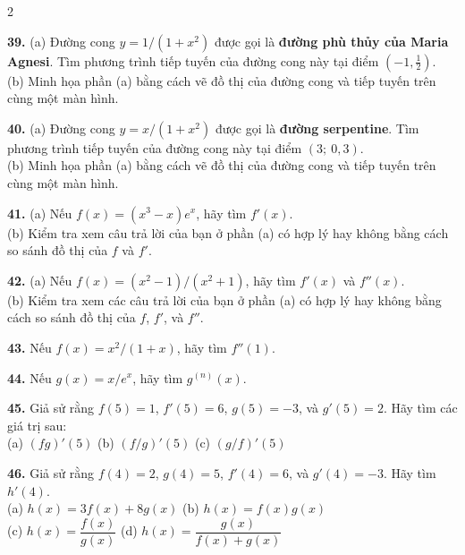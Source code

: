 \fontsize{9.2pt}{11.5pt}\selectfont

\begin{multicols}{2}

\noindent\textbf{39.} (a) Đường cong $y = 1/(1 + x^2)$ được gọi là \textbf{đường phù thủy của Maria Agnesi}. Tìm phương trình tiếp tuyến của đường cong này tại điểm $\left(-1, \frac{1}{2}\right)$.\\[2pt]
\llap{\graphicon\enspace}(b) Minh họa phần (a) bằng cách vẽ đồ thị của đường cong và tiếp tuyến trên cùng một màn hình.

\noindent\textbf{40.} (a) Đường cong $y = x/(1 + x^2)$ được gọi là \textbf{đường serpentine}. Tìm phương trình tiếp tuyến của đường cong này tại điểm $(3;\ 0{,}3)$.\\[2pt]
\llap{\graphicon\enspace}(b) Minh họa phần (a) bằng cách vẽ đồ thị của đường cong và tiếp tuyến trên cùng một màn hình.

\noindent\llap{\graphicon\enspace}\textbf{41.} (a) Nếu $f(x) = (x^3 - x)e^x$, hãy tìm $f'(x)$.\\[2pt]
(b) Kiểm tra xem câu trả lời của bạn ở phần (a) có hợp lý hay không bằng cách so sánh đồ thị của $f$ và $f'$.

\noindent\llap{\graphicon\enspace}\textbf{42.} (a) Nếu $f(x) = (x^2 - 1)/(x^2 + 1)$, hãy tìm $f'(x)$ và $f''(x)$.\\[2pt]
(b) Kiểm tra xem các câu trả lời của bạn ở phần (a) có hợp lý hay không bằng cách so sánh đồ thị của $f$, $f'$, và $f''$.

\noindent\textbf{43.} Nếu $f(x) = x^2/(1 + x)$, hãy tìm $f''(1)$.

\noindent\textbf{44.} Nếu $g(x) = x/e^x$, hãy tìm $g^{(n)}(x)$.

\noindent\textbf{45.} Giả sử rằng $f(5) = 1$, $f'(5) = 6$, $g(5) = -3$, và $g'(5) = 2$. Hãy tìm các giá trị sau:\\[2pt]
\hspace*{0.5em}(a) $(fg)'(5)$ \hfill (b) $(f/g)'(5)$ \hfill (c) $(g/f)'(5)$\hspace*{0.5em}

\noindent\textbf{46.} Giả sử rằng $f(4) = 2$, $g(4) = 5$, $f'(4) = 6$, và $g'(4) = -3$. Hãy tìm $h'(4)$.\\[2pt]
\hspace*{0.5em}(a) $h(x) = 3f(x) + 8g(x)$ \hfill (b) $h(x) = f(x)g(x)$\\[3pt]
\hspace*{0.5em}(c) $h(x) = \dfrac{f(x)}{g(x)}$ \hfill (d) $h(x) = \dfrac{g(x)}{f(x) + g(x)}$


\end{multicols}
